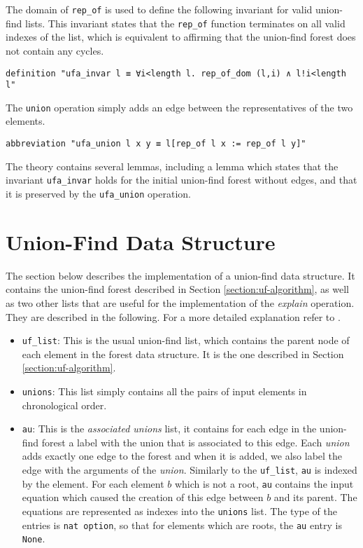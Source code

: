 The domain of \lstinline{rep_of} is used to define the following invariant for valid union-find lists. This invariant states that the \lstinline{rep_of} function terminates on all valid indexes of the list, which is equivalent to affirming that the union-find forest does not contain any cycles.

\begin{lstlisting}
definition "ufa_invar l ≡ ∀i<length l. rep_of_dom (l,i) ∧ l!i<length l"
\end{lstlisting}

The \lstinline{union} operation simply adds an edge between the representatives of the two elements.

\begin{lstlisting}
abbreviation "ufa_union l x y ≡ l[rep_of l x := rep_of l y]"
\end{lstlisting}

The theory contains several lemmas, including a lemma which states that the invariant \lstinline{ufa_invar} holds for the initial union-find forest without edges, and that it is preserved by the \lstinline{ufa_union} operation.

\section{Union-Find Data Structure}
\label{section:uf-data}

The section below describes the implementation of a union-find data structure.
It contains the union-find forest described in Section \ref{section:uf-algorithm}, as well as two other lists that are useful for the implementation of the \emph{explain} operation. They are described in the following. For a more detailed explanation refer to \cite{Nieuwenhuis}.

\begin{itemize}
	\item \lstinline{uf_list}: This is the usual union-find list, which contains the parent node of each element in the forest data structure. It is the one described in Section \ref{section:uf-algorithm}.

	\item \lstinline{unions}: This list simply contains all the pairs of input elements in chronological order.

	\item \lstinline{au}: This is the \emph{associated unions} list, it contains for each edge in the union-find forest a label with the union that is associated to this edge. Each \emph{union} adds exactly one edge to the forest and when it is added, we also label the edge with the arguments of the \emph{union}. Similarly to the \lstinline{uf_list}, \lstinline|au| is indexed by the element. For each element $b$ which is not a root, \lstinline{au} contains the input equation which caused the creation of this edge between $b$ and its parent. The equations are represented as indexes into the \lstinline{unions} list. The type of the entries is \lstinline{nat option}, so that for elements which are roots, the \lstinline{au} entry is \lstinline{None}.
\end{itemize}


